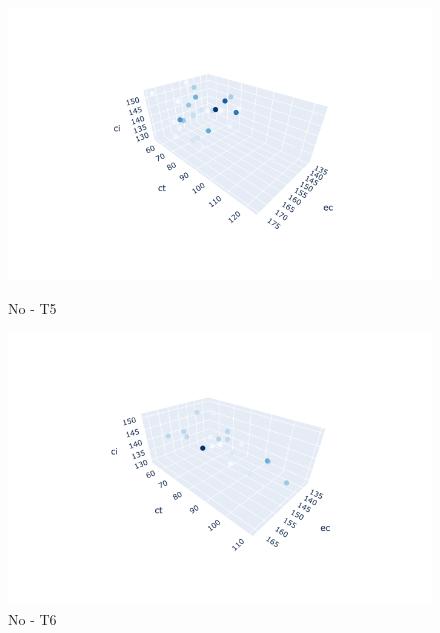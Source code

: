 \documentclass{hust}
\begin{document}
\begin{itemize}
	\begin{figure}[H]
		\begin{minipage}{0.5\textwidth}
			\centering
			\includegraphics[width=1.2\linewidth]{images/no-dem5.png}
			\caption{No - T5}\label{fig:nsga-ii-no-dem5}
		\end{minipage}\hfill
		\begin{minipage}{0.5\textwidth}
			\centering
			\includegraphics[width=1.2\linewidth]{images/no-dem6.png}
			\caption{No - T6}\label{fig:nsga-ii-no-dem6}
		\end{minipage}
	\end{figure}
	

\end{itemize}
\end{document}
